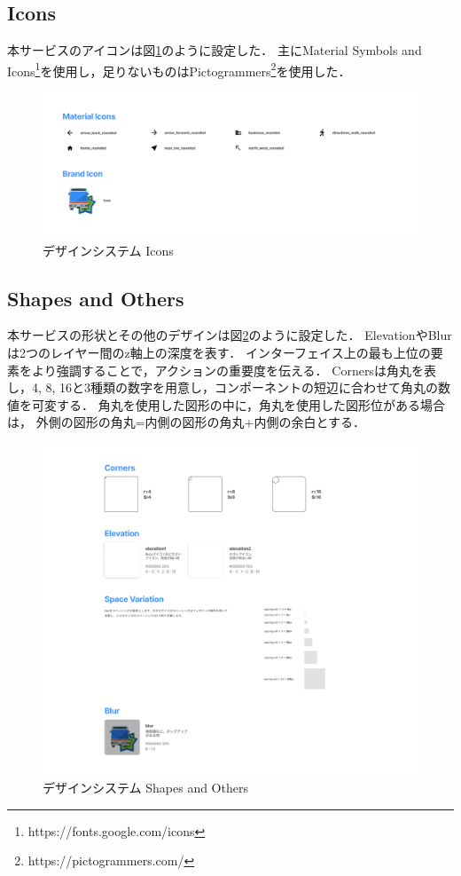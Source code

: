 \subsection{Icons}
    本サービスのアイコンは図\ref{fig:icons}のように設定した．
    主にMaterial Symbols and Icons\footnote{https://fonts.google.com/icons}を使用し，足りないものはPictogrammers\footnote{https://pictogrammers.com/}を使用した．
        \begin{figure}[H]
            \centering
            \includegraphics[width=14cm]{images/icons.png}
            \caption{デザインシステム Icons}
            \label{fig:icons}
        \end{figure}
\subsection{Shapes and Others}
    本サービスの形状とその他のデザインは図\ref{fig:shapes}のように設定した．
    ElevationやBlurは2つのレイヤー間のz軸上の深度を表す．
    インターフェイス上の最も上位の要素をより強調することで，アクションの重要度を伝える．
    Cornersは角丸を表し，4, 8, 16と3種類の数字を用意し，コンポーネントの短辺に合わせて角丸の数値を可変する．
    角丸を使用した図形の中に，角丸を使用した図形位がある場合は，
    外側の図形の角丸=内側の図形の角丸+内側の余白とする．
\begin{figure}[H]
    \centering
    \includegraphics[width=14cm]{images/shapes.png}
    \caption{デザインシステム Shapes and Others}
    \label{fig:shapes}
\end{figure}

